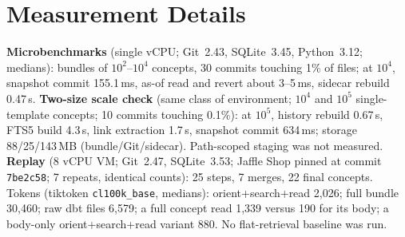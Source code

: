 \documentclass[conference,letterpaper]{IEEEtran}
\begin{document}
\section{Measurement Details}\label{app:measure}
\textbf{Microbenchmarks} (single vCPU; Git~2.43, SQLite~3.45, Python~3.12; medians): bundles of $10^2$--$10^4$ concepts, 30 commits touching 1\% of files; at $10^4$, snapshot commit 155.1\,ms, as-of read and revert about 3--5\,ms, sidecar rebuild 0.47\,s.
\textbf{Two-size scale check} (same class of environment; $10^4$ and $10^5$ single-template concepts; 10 commits touching 0.1\%): at $10^5$, history rebuild 0.67\,s, FTS5 build 4.3\,s, link extraction 1.7\,s, snapshot commit 634\,ms; storage 88/25/143\,MB (bundle/Git/sidecar). Path-scoped staging was not measured.
\textbf{Replay} (8 vCPU VM; Git~2.47, SQLite~3.53; Jaffle Shop pinned at commit \texttt{7be2c58}; 7 repeats, identical counts): 25 steps, 7 merges, 22 final concepts. Tokens (tiktoken \texttt{cl100k\_base}, medians): orient+search+read 2{,}026; full bundle 30{,}460; raw dbt files 6{,}579; a full concept read 1{,}339 versus 190 for its body; a body-only orient+search+read variant 880. No flat-retrieval baseline was run.
\end{document}
